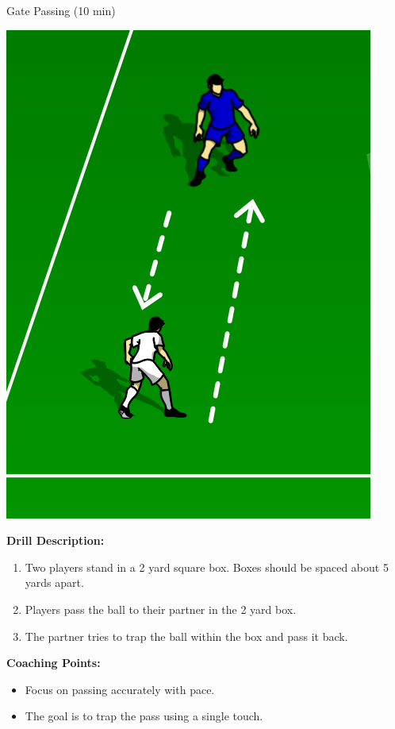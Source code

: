 \begin{oddBlock}{Gate Passing (10 min)}

\begin{minipage}[t]{\linewidth}
    \centering
    
    \begin{minipage}{.3\linewidth} %
            \includegraphics[width=.6\textwidth]{../img/Trimmed/Lane_Passing}
    \end{minipage}
    \hspace{0.05\linewidth}
    \begin{minipage}{.6\linewidth} %
        \textbf{Drill Description:}

        \begin{enumerate}
        \setlength{\itemsep}{0pt}
        \setlength{\parskip}{0pt}
        \setlength{\parsep}{0pt}
        \item Two players stand in a 2 yard square box.  Boxes should be spaced about 5 yards apart.
        \item Players pass the ball to their partner in the 2 yard box.
        \item The partner tries to trap the ball within the box and pass it back.
        \end{enumerate}

        \textbf{Coaching Points:}
        \begin{itemize}
        \setlength{\itemsep}{0pt}
        \setlength{\parskip}{0pt}
        \setlength{\parsep}{0pt}
        \item Focus on passing accurately with pace.
        \item The goal is to trap the pass using a single touch.
        \end{itemize}

    \end{minipage}
\end{minipage}

\end{oddBlock}